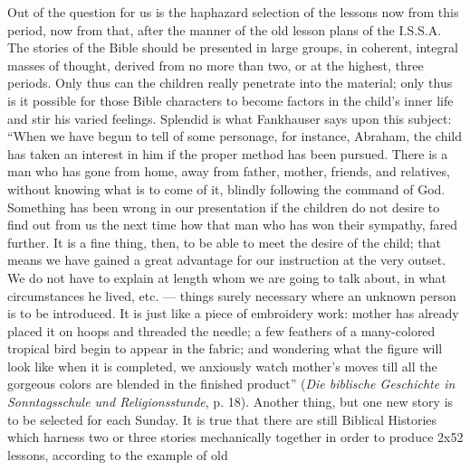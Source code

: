 Out of the question for us is the haphazard selection
of the lessons now from this period, now from that, after the manner of the old lesson plans of the I.S.S.A. The stories of the Bible should be presented in large groups, in coherent, integral masses of thought, derived from no more than two, or at the highest, three periods. Only thus can the children really penetrate into the material; only thus is it possible for those Bible characters to become factors in the child’s inner life and stir his varied feelings. Splendid is what Fankhauser says upon this subject: “When we have begun to tell of some personage, for instance, Abraham, the child has taken an interest in him if the proper method has been pursued. There is a man who has gone from home, away from father, mother, friends, and relatives, without knowing what is to come of it, blindly following the command of God. Something has been wrong in our presentation if the children do not desire to find out from us the next time how that man who has won their sympathy, fared further. It is a fine thing, then, to be able to meet the desire of the child; that means we have gained a great advantage for our instruction at the very outset. We do not have to explain at length whom we are going to talk about, in what circumstances he lived, etc. — things surely necessary where an unknown person is to be introduced. It is just like a piece of embroidery work: mother has already placed it on hoops and threaded the needle; a few feathers of a many-colored tropical bird begin to appear in the fabric; and wondering what the figure will look like when it is completed, we anxiously watch mother’s moves till all the gorgeous colors are blended in the finished product” (\emph{Die biblische Geschichte in Sonntagsschule und Religionsstunde}, p. 18). Another thing, but one new story is to be selected for each Sunday. It is true that there are still Biblical Histories which harness two or three stories mechanically together in order to produce 2x52 lessons, according to the example of old
